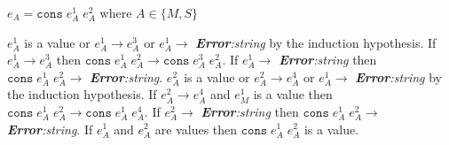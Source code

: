 \begin{case}

$e_{A}=\mathtt{cons}\;e_{A}^{1}\;e_{A}^{2}$ where $A\in\lbrace M,S\rbrace$

$e_{A}^{1}$ is a value or $e_{A}^{1}\rightarrow e_{A}^{3}$ or $e_{A}^{1}\rightarrow$ \emph{\textbf{Error}:\;string} by the induction hypothesis.  If $e_{A}^{1}\rightarrow e_{A}^{3}$ then $\mathtt{cons}\;e_{A}^{1}\;e_{A}^{2}\rightarrow\mathtt{cons}\;e_{A}^{3}\;e_{A}^{2}$.  If $e_{A}^{1}\rightarrow$ \emph{\textbf{Error}:\;string} then $\mathtt{cons}\;e_{A}^{1}\;e_{A}^{2}\rightarrow$ \emph{\textbf{Error}:\;string}.  $e_{A}^{2}$ is a value or $e_{A}^{2}\rightarrow e_{A}^{4}$ or $e_{A}^{1}\rightarrow$ \emph{\textbf{Error}:\;string} by the induction hypothesis.  If $e_{A}^{2}\rightarrow e_{A}^{4}$ and $e_{M}^{1}$ is a value then $\mathtt{cons}\;e_{A}^{1}\;e_{A}^{2}\rightarrow\mathtt{cons}\;e_{A}^{1}\;e_{A}^{4}$.  If $e_{A}^{2}\rightarrow$ \emph{\textbf{Error}:\;string} then $\mathtt{cons}\;e_{A}^{1}\;e_{A}^{2}\rightarrow$ \emph{\textbf{Error}:\;string}.  If $e_{A}^{1}$ and $e_{A}^{2}$ are values then $\mathtt{cons}\;e_{A}^{1}\;e_{A}^{2}$ is a value.

\end{case}